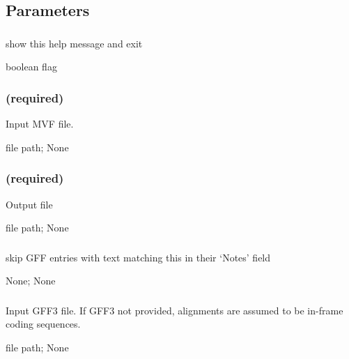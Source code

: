 \documentclass[letterpaper,11pt,english]{sphinxmanual}
\begin{document}
\subsection{Parameters}
\label{\detokenize{prog_desc:id149}}

\subsubsection{}
\label{\detokenize{prog_desc:id150}}
 show this help message and exit

 boolean flag


\subsubsection{ (required)}
\label{\detokenize{prog_desc:id151}}
 Input MVF file.

 file path;  None


\subsubsection{ (required)}
\label{\detokenize{prog_desc:id152}}
 Output file

 file path;  None


\subsubsection{}
\label{\detokenize{prog_desc:id153}}
 skip GFF entries with text matching this in their ‘Notes’ field

 None;  None


\subsubsection{}
\label{\detokenize{prog_desc:id154}}
 Input GFF3 file. If GFF3 not provided, alignments are assumed to be in-frame coding sequences.

 file path;  None
\end{document}
